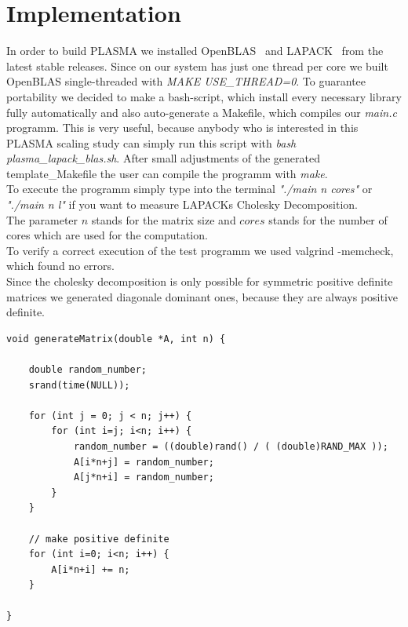 \documentclass[a4paper,final,ngerman,english]{article}
\begin{document}
\section{Implementation}

In order to build PLASMA we installed OpenBLAS~\cite{openblas01} and LAPACK~\cite{lawn20} from the latest stable releases.
Since on our system has just one thread per core we built OpenBLAS single-threaded with \textit{MAKE USE\_THREAD=0}.
To guarantee portability we decided to make a bash-script, which install every necessary library fully automatically and also auto-generate a Makefile, which compiles our \textit{main.c} programm.
This is very useful, because anybody who is interested in this PLASMA scaling study can simply run this script with \textit{bash plasma\_lapack\_blas.sh}.
After small adjustments of the generated template\_Makefile the user can compile the programm with \textit{make}.
\\
To execute the programm simply type into the terminal \textit{"./main n cores"} or \textit{"./main n l"} if you want to measure LAPACKs Cholesky Decomposition.\\ The parameter $n$ stands for the matrix size and $cores$ stands for the number of cores which are used for the computation.\\
To verify a correct execution of the test programm we used valgrind -memcheck, which found no errors.\\
Since the cholesky decomposition is only possible for symmetric positive definite matrices we generated diagonale dominant ones, because they are always positive definite.
\begin{lstlisting}
void generateMatrix(double *A, int n) {

	double random_number;
	srand(time(NULL));

	for (int j = 0; j < n; j++) {
		for (int i=j; i<n; i++) {
			random_number = ((double)rand() / ( (double)RAND_MAX ));
			A[i*n+j] = random_number;
			A[j*n+i] = random_number;
		}
	}

	// make positive definite
	for (int i=0; i<n; i++) {
		A[i*n+i] += n;
	}

}
\end{lstlisting}
\end{document}
